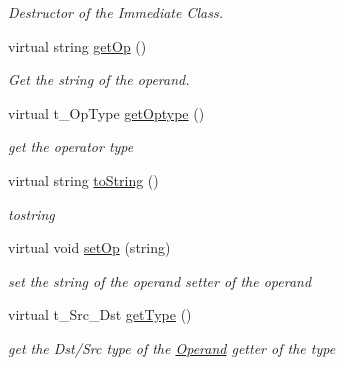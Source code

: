 \begin{DoxyCompactItemize}
\begin{DoxyCompactList}\small\item\em Destructor of the Immediate Class. \item\end{DoxyCompactList}\item 
virtual string \hyperlink{classOPImmediate_a36a14a13ac2dde34bba3d31cfd474f9b}{getOp} ()
\begin{DoxyCompactList}\small\item\em Get the string of the operand. \item\end{DoxyCompactList}\item 
virtual t\_\-OpType \hyperlink{classOPImmediate_af637aedc23b19948b3b2a3de80b730e7}{getOptype} ()
\begin{DoxyCompactList}\small\item\em get the operator type \item\end{DoxyCompactList}\item 
virtual string \hyperlink{classOPImmediate_adbf4bcd0bd6be9d6cb0dcbc5e09ff900}{toString} ()
\begin{DoxyCompactList}\small\item\em tostring \item\end{DoxyCompactList}\item 
\hypertarget{classOPImmediate_a3fe67ad761df93fb741c3837f1cc5711}{
virtual void \hyperlink{classOPImmediate_a3fe67ad761df93fb741c3837f1cc5711}{setOp} (string)}
\label{classOPImmediate_a3fe67ad761df93fb741c3837f1cc5711}

\begin{DoxyCompactList}\small\item\em set the string of the operand setter of the operand \item\end{DoxyCompactList}\item 
\hypertarget{classOPImmediate_a21f9307817b2a14e642f94e5175b925a}{
virtual t\_\-Src\_\-Dst \hyperlink{classOPImmediate_a21f9307817b2a14e642f94e5175b925a}{getType} ()}
\label{classOPImmediate_a21f9307817b2a14e642f94e5175b925a}

\begin{DoxyCompactList}\small\item\em get the Dst/Src type of the \hyperlink{classOperand}{Operand} getter of the type \item\end{DoxyCompactList}\end{DoxyCompactItemize}


